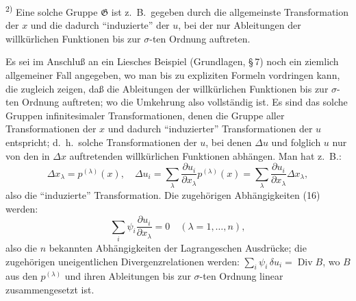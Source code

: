 \documentclass[12pt,a4paper]{article}
\begin{document}
\smallskip
\noindent\textsuperscript{2)} Eine solche Gruppe $\mathfrak{G}$ ist z.\ B.\ gegeben durch die allgemeinste Transformation der $x$ und die dadurch ``induzierte'' der $u$, bei der nur Ableitungen der willk\"urlichen Funktionen bis zur $\sigma$-ten Ordnung auftreten.

Es sei im Anschlu\ss{} an ein Liesches Beispiel (Grundlagen, \S\,7) noch ein ziemlich allgemeiner Fall angegeben, wo man bis zu expliziten Formeln vordringen kann, die zugleich zeigen, da\ss{} die Ableitungen der willk\"urlichen Funktionen bis zur $\sigma$-ten Ordnung auftreten; wo die Umkehrung also vollst\"andig ist. Es sind das solche Gruppen infinitesimaler Transformationen, denen die Gruppe aller Transformationen der $x$ und dadurch ``induzierter'' Transformationen der $u$ entspricht; d.\ h.\ solche Transformationen der $u$, bei denen $\Delta u$ und folglich $u$ nur von den in $\Delta x$ auftretenden willk\"urlichen Funktionen abh\"angen. Man hat z.\ B.:
\begin{equation}\tag{19}
\Delta x_{\lambda}=p^{(\lambda)}(x),\quad\Delta u_{i}=\sum_{\lambda}\frac{\partial u_{i}}{\partial x_{\lambda}}p^{(\lambda)}(x)=\sum_{\lambda}\frac{\partial u_{i}}{\partial x_{\lambda}}\Delta x_{\lambda},
\end{equation}
also die ``induzierte'' Transformation. Die zugeh\"origen Abh\"angigkeiten (16) werden:
\begin{equation}\tag{20}
\sum_{i}\psi_{i}\frac{\partial u_{i}}{\partial x_{\lambda}}=0\quad(\lambda=1,\ldots,n),
\end{equation}
also die $n$ bekannten Abh\"angigkeiten der Lagrangeschen Ausdr\"ucke; die zugeh\"origen uneigentlichen Divergenzrelationen werden: $\sum_{i}\psi_{i}\,\delta u_{i}=\operatorname{Div}B$, wo $B$ aus den $p^{(\lambda)}$ und ihren Ableitungen bis zur $\sigma$-ten Ordnung linear zusammengesetzt ist.
\end{document}
